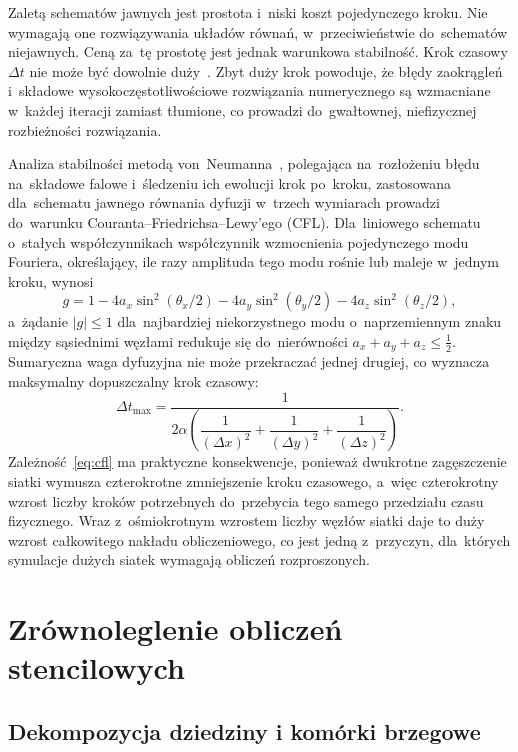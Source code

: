 Zaletą schematów jawnych jest prostota i~niski koszt pojedynczego kroku. Nie wymagają one rozwiązywania układów równań, w~przeciwieństwie do~schematów
niejawnych. Ceną za~tę prostotę jest jednak warunkowa stabilność. Krok czasowy
\(\Delta t\) nie może być dowolnie duży~\cite{leveque,morton-mayers}. Zbyt duży krok powoduje, że błędy
zaokrągleń i~składowe wysokoczęstotliwościowe rozwiązania numerycznego są
wzmacniane w~każdej iteracji zamiast tłumione, co prowadzi do~gwałtownej,
niefizycznej rozbieżności rozwiązania.

Analiza stabilności metodą von~Neumanna~\cite{strikwerda,leveque}, polegająca na~rozłożeniu
błędu na~składowe falowe i~śledzeniu ich ewolucji krok po~kroku, zastosowana dla~schematu
jawnego równania dyfuzji w~trzech wymiarach prowadzi do~warunku
Couranta--Friedrichsa--Lewy'ego (CFL). Dla~liniowego schematu o~stałych
współczynnikach współczynnik wzmocnienia pojedynczego modu Fouriera, określający, ile razy
amplituda tego modu rośnie lub maleje w~jednym kroku, wynosi
\begin{equation}
  g = 1 - 4a_x\sin^2(\theta_x/2) - 4a_y\sin^2(\theta_y/2) - 4a_z\sin^2(\theta_z/2),
  \label{eq:amp}
\end{equation}
a~żądanie \(\lvert g\rvert\le 1\) dla~najbardziej niekorzystnego modu o~naprzemiennym
znaku między sąsiednimi węzłami redukuje się do~nierówności
\(a_x+a_y+a_z\le\tfrac12\). Sumaryczna waga dyfuzyjna nie może przekraczać jednej
drugiej, co wyznacza maksymalny dopuszczalny krok czasowy:
\begin{equation}
  \Delta t_{\max}
  = \frac{1}{2\alpha\!\left(\dfrac{1}{(\Delta x)^2}
    + \dfrac{1}{(\Delta y)^2} + \dfrac{1}{(\Delta z)^2}\right)}.
  \label{eq:cfl}
\end{equation}
Zależność~\eqref{eq:cfl} ma praktyczne konsekwencje, ponieważ dwukrotne
zagęszczenie siatki wymusza czterokrotne
zmniejszenie kroku czasowego, a~więc czterokrotny wzrost liczby kroków
potrzebnych do~przebycia tego samego przedziału czasu fizycznego. Wraz
z~ośmiokrotnym wzrostem liczby węzłów siatki daje to duży
wzrost całkowitego nakładu obliczeniowego, co jest jedną z~przyczyn, dla~których
symulacje dużych siatek wymagają obliczeń rozproszonych.

\section{Zrównoleglenie obliczeń stencilowych}
\label{sec:parallel}

\subsection{Dekompozycja dziedziny i komórki brzegowe}

